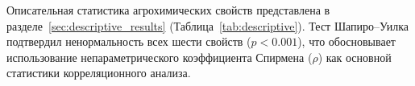 Описательная статистика агрохимических свойств представлена в разделе~\ref{sec:descriptive_results} (Таблица~\ref{tab:descriptive}).
Тест Шапиро--Уилка подтвердил ненормальность всех шести свойств ($p < 0.001$), что обосновывает использование непараметрического коэффициента Спирмена ($\rho$) как основной статистики корреляционного анализа.
